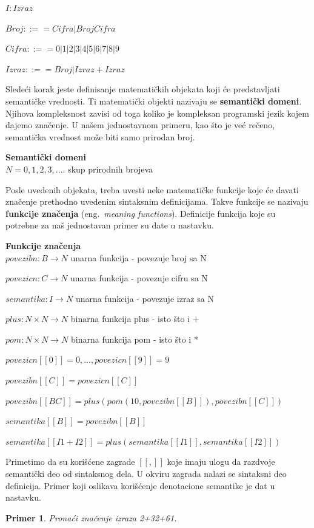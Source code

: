 \documentclass[a4paper]{article}
\newtheorem{primer}{Primer}[section]
\begin{document}
{\begin{tcolorbox}
$I: Izraz $

$ Broj ::== Cifra | Broj Cifra $

$ Cifra ::== 0 | 1 | 2 | 3 | 4 | 5 | 6 | 7 | 8 | 9 $

$ Izraz ::== Broj | Izraz+Izraz $
\end{tcolorbox}

Sledeći korak jeste definisanje matematičkih objekata koji će predstavljati semantičke vrednosti.  Ti matematički objekti nazivaju se \textbf{semantički domeni}. Njihova kompleksnost zavisi od toga koliko je kompleksan programski jezik kojem dajemo značenje. U našem jednostavnom primeru, kao što je već rečeno, semantička vrednost može biti samo prirodan broj.
\begin{tcolorbox}
\textbf{Semantički domeni}
\\

$N={0,1,2,3,....} $  \qquad\qquad skup prirodnih brojeva

\end{tcolorbox}
Posle uvedenih objekata, treba uvesti neke matematičke funkcije koje će davati značenje prethodno uvedenim sintaksnim definicijama. Takve funkcije se nazivaju \textbf{funkcije značenja }(eng.~{\em meaning functions}). Definicije funkcija koje su potrebne za naš jednostavan primer su date u nastavku.
\begin{tcolorbox}
\textbf{Funkcije značenja}
\\

$povezibn: B \rightarrow N $  \qquad unarna funkcija - povezuje broj sa N

$povezicn: C \rightarrow N $  \qquad unarna funkcija - povezuje cifru sa N

$semantika: I \rightarrow N $   \qquad unarna funkcija - povezuje izraz sa N

$plus: N \times N \rightarrow N $  \qquad binarna funkcija plus - isto što i +

$pom: N \times N \rightarrow N $ \qquad binarna funkcija pom - isto što i *

$ povezicn[[0]] = 0,... ,povezicn[[9]] = 9 $

$ povezibn[[C]] = povezicn[[C]] $

$ povezibn[[B C]] = plus(pom(10, povezibn[[B]]),povezibn[[C]]) $

$ semantika[[B]] = povezibn[[B]] $

$ semantika[[I1 + I2]] = plus(semantika[[I1]],semantika[[I2]]) $

\end{tcolorbox}
Primetimo da su korišćene zagrade $ [[,]]$ koje imaju ulogu da razdvoje semantički deo od sintaksnog dela. U okviru zagrada nalazi se sintaksni deo definicija. Primer koji oslikava korišćenje denotacione semantike je dat u nastavku.
\begin{primer}
Pronaći značenje izraza 2+32+61.


\end{primer}}
\end{document}
